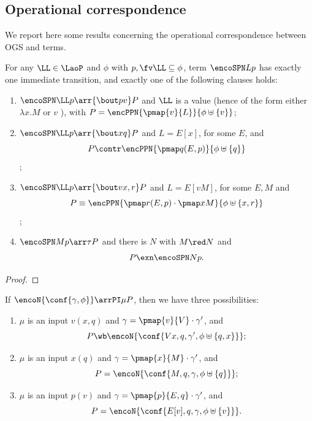 \subsection{Operational correspondence}
\label{ss:oc_cbn}

We report here some results concerning the operational correspondence between 
OGS  and \piI terms. 


\begin{lemma}
\label{l:opt_op_cbn}
For any
  $\LL\in\LaoP$  and $\phi $ with 
 $p,\fv \LL \subseteq \phi$,  term  $\encoSPN L p$ has exactly
  one immediate transition, and exactly one of the following clauses holds:
\begin{enumerate}
\item $\encoSPN \LL p\arr{\bout pv} P $  
and $\LL$ is a value (hence of the form either  $ \lambda x. M $ or
$v$ ),  
 with $P =\encPPN { \pmap{v}{L}}{\phi \uplus \{v\}}$;

\item  
 $\encoSPN \LL p\arr{\bout x {q}}P$  
and $L =  
{E [x]}$, for some $E$, and 
$$P \contr  
  \encPPN { \pmap q{(E,p)}} {\phi \uplus \{q\}}
$$;

\item 
 $\encoSPN \LL p\arr{\bout v {x,r}}P$  
and $L =  
{E [v M]}$, for some $E,M$ 
and 
$$P \equiv 
  \encPPN { \pmap r{(E,p)}\cdot  \pmap x M } {\phi \uplus \{x,r\}}
$$;


\item 
$\encoSPN M p\arr\tau P$ and there is $N$  with $M\red N$ and
  $$P\exn \encoSPN  N p.$$ 
\end{enumerate}
\end{lemma}

\ifcutCBNLMCS 
\begin{proof}
\end{proof}
\fi


\begin{lemma}
\label{l:opt_con_cbn}
If  $\encoN{\conf {\gamma, \phi }} \arrPI \mu P$,
 then we have three possibilities:
\begin{enumerate}

\item $\mu $ is an input $v(x,q)$ and $\gamma 
= \pmap{v}{V}\cdot\gamma' $, and 
$$P \wb 
\encoN {
\conf{ V x,  q, \gamma', \phi \uplus \{ q,x\}}
} ;$$ 


\item $\mu $ is an input $x(q)$ and $\gamma 
= \pmap{x}{M}\cdot\gamma' $, and 
$$P  =
\encoN {
\conf{ M,  q, \gamma, \phi \uplus \{ q\}}
} ;$$ 


\item $\mu $ is an input $p(v)$ and $\gamma 
= \pmap{p}{E,q}\cdot\gamma' $, and 
$$P  = 
\encoN {
\conf{ E[v],  q, \gamma, \phi \uplus \{ v\}}
} .$$ 
\end{enumerate} 
\end{lemma} 


